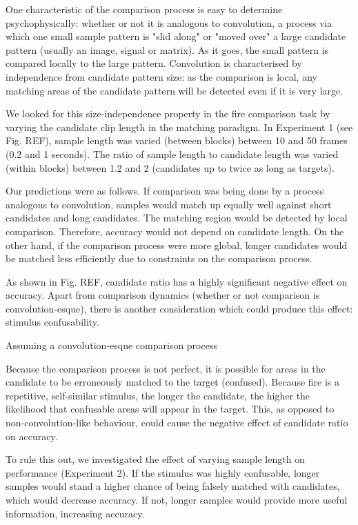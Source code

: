 \documentclass{jov}
\begin{document}
One characteristic of the comparison process is easy to determine psychophysically: whether or not it is analogous to convolution, a process via which one small sample pattern is "slid along" or "moved over" a large candidate pattern (usually an image, signal or matrix). As it goes, the small pattern is compared locally to the large pattern. Convolution is characterised by independence from candidate pattern size: as the comparison is local, any matching areas of the candidate pattern will be detected even if it is very large.

We looked for this size-independence property in the fire comparison task by varying the candidate clip length in the matching paradigm. In Experiment 1 (see Fig. REF), sample length was varied (between blocks) between 10 and 50 frames (0.2 and 1 seconds). The ratio of sample length to candidate length was varied (within blocks) between 1.2 and 2 (candidates up to twice as long as targets).

Our predictions were as follows. If comparison was being done by a process analogous to convolution, samples would match up equally well against short candidates and long candidates. The matching region would be detected by local comparison. Therefore, accuracy would not depend on candidate length. On the other hand, if the comparison process were more global, longer candidates would be matched less efficiently due to constraints on the comparison process.

As shown in Fig. REF, candidate ratio has a highly significant negative effect on accuracy. Apart from comparison dynamics (whether or not comparison is convolution-esque), there is another consideration which could produce this effect: stimulus confusability.

Assuming a convolution-esque comparison process

Because the comparison process is not perfect, it is possible for areas in the candidate to be erroneously matched to the target (confused). Because fire is a repetitive, self-similar stimulus, the longer the candidate, the higher the likelihood that confusable areas will appear in the target. This, as opposed to non-convolution-like behaviour, could cause the negative effect of candidate ratio on accuracy.

To rule this out, we investigated the effect of varying sample length on performance (Experiment 2). If the stimulus was highly confusable, longer samples would stand a higher chance of being falsely matched with candidates, which would decrease accuracy. If not, longer samples would provide more useful information, increasing accuracy.
\end{document}
